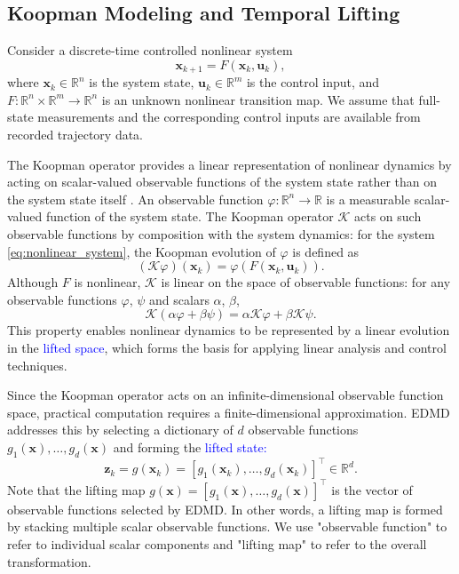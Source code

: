 \documentclass[journal]{IEEEtran}
\newcommand{\vx}{\mathbf{x}}
\newcommand{\vu}{\mathbf{u}}
\newcommand{\vz}{\mathbf{z}}
\begin{document}
\subsection{Koopman Modeling and Temporal Lifting}
\label{sec:preliminary}

Consider a discrete-time controlled nonlinear system
\begin{equation}
    \vx_{k+1} = F(\vx_k, \vu_k),
    \label{eq:nonlinear_system}
\end{equation}
where $\vx_k \in \mathbb{R}^n$ is the system state, $\vu_k \in \mathbb{R}^m$ is the control input, and $F:\mathbb{R}^n \times \mathbb{R}^m \to \mathbb{R}^n$ is an unknown nonlinear transition map. We assume that full-state measurements and the corresponding control inputs are available from recorded trajectory data.

The Koopman operator provides a linear representation of nonlinear dynamics by acting on scalar-valued observable functions of the system state rather than on the system state itself \cite{koopman1931hamiltonian, mezic2005spectral, rowley2009spectral, brunton2022modern}. An observable function $\varphi:\mathbb{R}^n\to\mathbb{R}$ is a measurable scalar-valued function of the system state. The Koopman operator $\mathcal{K}$ acts on such observable functions by composition with the system dynamics: for the system \eqref{eq:nonlinear_system}, the Koopman evolution of $\varphi$ is defined as
\begin{equation}
    (\mathcal{K}\varphi)(\vx_k) = \varphi(F(\vx_k,\vu_k)).
    \label{eq:koopman_operator}
\end{equation}
Although $F$ is nonlinear, $\mathcal{K}$ is linear on the space of observable functions: for any observable functions $\varphi$, $\psi$ and scalars $\alpha$, $\beta$,
\begin{equation}
    \mathcal{K}(\alpha \varphi + \beta \psi)
    = \alpha \mathcal{K}\varphi + \beta \mathcal{K}\psi.
    \label{eq:koopman_linearity}
\end{equation}
This property enables nonlinear dynamics to be represented by a linear evolution in the \textcolor{blue}{lifted space}, which forms the basis for applying linear analysis and control techniques.

Since the Koopman operator acts on an infinite-dimensional observable function space, practical computation requires a finite-dimensional approximation. EDMD addresses this by selecting a dictionary of $d$ observable functions $g_1(\vx),\ldots,g_d(\vx)$ and forming the \textcolor{blue}{lifted state:}
\begin{equation}
    \vz_k = g(\vx_k) = [g_1(\vx_k), \ldots, g_d(\vx_k)]^\top \in \mathbb{R}^d.
    \label{eq:instantaneous_lifting}
\end{equation}
Note that the lifting map $g(\vx) = [g_1(\vx), \ldots, g_d(\vx)]^\top$ is the vector of observable functions selected by EDMD. In other words, a lifting map is formed by stacking multiple scalar observable functions. We use "observable function" to refer to individual scalar components and "lifting map" to refer to the overall transformation.
\end{document}
